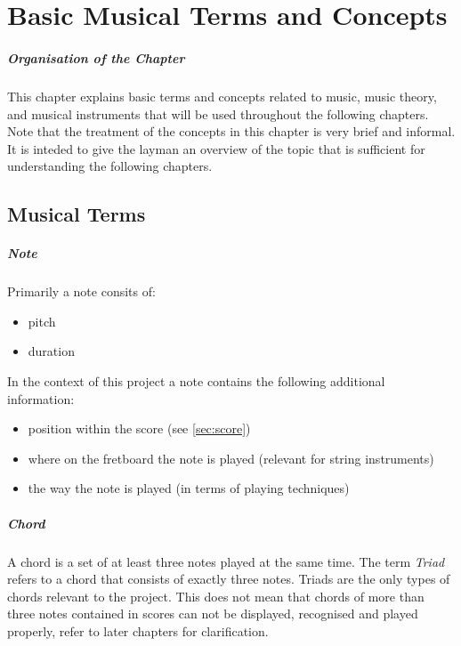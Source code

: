 \chapter[Basic Musical Terms and Concepts \textsuperscript{Novotny}]{Basic Musical Terms and Concepts}
\label{chap:Basic Musical Terms}

\paragraph{Organisation of the Chapter}
This chapter explains basic terms and concepts related to music, music theory, and musical instruments that will be used throughout the following chapters. Note that the treatment of the concepts in this chapter is very brief and informal. It is inteded to give the layman an overview of the topic that is sufficient for understanding the following chapters.

\section{Musical Terms}
\paragraph{Note}
Primarily a note consits of:

\begin{itemize}
	\item{pitch}
	\item{duration}
\end{itemize}

In the context of this project a note contains the following additional information:
\begin{itemize}
	\item{position within the score (see \ref{sec:score})}
	\item{where on the fretboard the note is played (relevant for string instruments)}
	\item{the way the note is played (in terms of playing techniques)}
\end{itemize}

\paragraph{Chord}
A chord is a set of at least three notes played at the same time. 
The term \textit{Triad} refers to a chord that consists of exactly three notes. Triads are the only types of chords relevant to the project. This does not mean that chords of more than three notes contained in scores can not be displayed, recognised and played properly, refer to later chapters for clarification.

